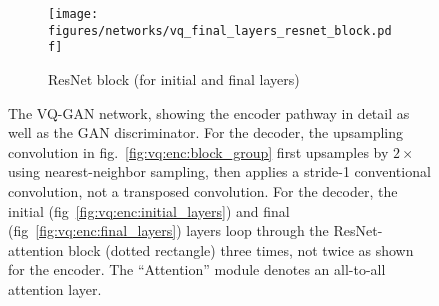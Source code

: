 \begin{figure}
    \begin{subfigure}[c]{0.3\textwidth}
        \centering
        \texttt{[image: figures/networks/vq\_final\_layers\_resnet\_block.pdf]}
        \caption{ResNet block (for initial and final layers)\label{fig:vq:enc:final:resnet_block}}
    \end{subfigure}
    \caption{The VQ-GAN network, showing the encoder pathway in detail as well as the GAN discriminator. For the decoder, the upsampling convolution in fig.~\ref{fig:vq:enc:block_group} first upsamples by $2\times$ using nearest-neighbor sampling, then applies a stride-1 conventional convolution, not a transposed convolution. For the decoder, the initial (fig~\ref{fig:vq:enc:initial_layers}) and final (fig~\ref{fig:vq:enc:final_layers}) layers loop through the ResNet-attention block (dotted rectangle) three times, not twice as shown for the encoder. The ``Attention'' module denotes an all-to-all attention layer. 
    \label{fig:vq}}
\end{figure}


